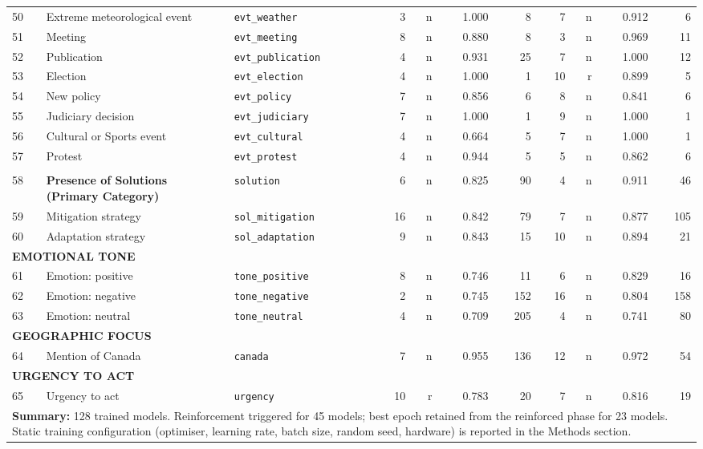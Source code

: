 \begin{longtable}{p{0.5cm}p{4.0cm}p{3.0cm}rrrrrrrr}
50 & Extreme meteorological event & \texttt{evt\_weather} & 3 & n & 1.000 & 8 & 7 & n & 0.912 & 6 \\
51 & Meeting & \texttt{evt\_meeting} & 8 & n & 0.880 & 8 & 3 & n & 0.969 & 11 \\
52 & Publication & \texttt{evt\_publication} & 4 & n & 0.931 & 25 & 7 & n & 1.000 & 12 \\
53 & Election & \texttt{evt\_election} & 4 & n & 1.000 & 1 & 10 & r & 0.899 & 5 \\
54 & New policy & \texttt{evt\_policy} & 7 & n & 0.856 & 6 & 8 & n & 0.841 & 6 \\
55 & Judiciary decision & \texttt{evt\_judiciary} & 7 & n & 1.000 & 1 & 9 & n & 1.000 & 1 \\
56 & Cultural or Sports event & \texttt{evt\_cultural} & 4 & n & 0.664 & 5 & 7 & n & 1.000 & 1 \\
57 & Protest & \texttt{evt\_protest} & 4 & n & 0.944 & 5 & 5 & n & 0.862 & 6 \\
\midrule
\rowcolor{gray!8}
\multicolumn{11}{l}{\textit{Solutions}} \\
\midrule
58 & \textbf{Presence of Solutions\newline (Primary Category)} & \texttt{solution} & 6 & n & 0.825 & 90 & 4 & n & 0.911 & 46 \\
\cmidrule(lr){1-11}
59 & Mitigation strategy & \texttt{sol\_mitigation} & 16 & n & 0.842 & 79 & 7 & n & 0.877 & 105 \\
60 & Adaptation strategy & \texttt{sol\_adaptation} & 9 & n & 0.843 & 15 & 10 & n & 0.894 & 21 \\
\midrule
\multicolumn{11}{l}{\cellcolor{gray!10}\textbf{EMOTIONAL TONE}} \\
\midrule
61 & Emotion: positive & \texttt{tone\_positive} & 8 & n & 0.746 & 11 & 6 & n & 0.829 & 16 \\
62 & Emotion: negative & \texttt{tone\_negative} & 2 & n & 0.745 & 152 & 16 & n & 0.804 & 158 \\
63 & Emotion: neutral & \texttt{tone\_neutral} & 4 & n & 0.709 & 205 & 4 & n & 0.741 & 80 \\
\midrule
\multicolumn{11}{l}{\cellcolor{gray!10}\textbf{GEOGRAPHIC FOCUS}} \\
\midrule
64 & Mention of Canada & \texttt{canada} & 7 & n & 0.955 & 136 & 12 & n & 0.972 & 54 \\
\midrule
\multicolumn{11}{l}{\cellcolor{gray!10}\textbf{URGENCY TO ACT}} \\
\midrule
65 & Urgency to act & \texttt{urgency} & 10 & r & 0.783 & 20 & 7 & n & 0.816 & 19 \\
\multicolumn{11}{p{12cm}}{\cellcolor{gray!20}\textbf{Summary:} 128 trained models. Reinforcement triggered for 45 models; best epoch retained from the reinforced phase for 23 models. Static training configuration (optimiser, learning rate, batch size, random seed, hardware) is reported in the Methods section.} \\
\end{longtable}